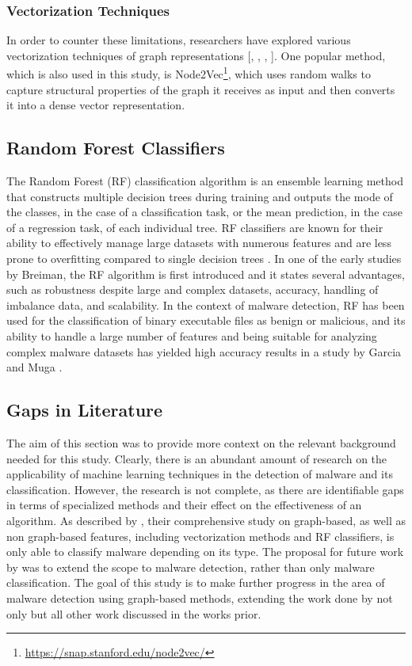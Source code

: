 \documentclass[11pt]{article}
\begin{document}
\subsubsection{Vectorization Techniques}
In order to counter these limitations, researchers have explored various vectorization techniques of graph representations [\cite{hashemi2017graph}, \cite{9023948}, \cite{10.1145/3664649}, \cite{AMJATH2025103651}]. One popular method, which is also used in this study, is Node2Vec\footnote{\href{https://snap.stanford.edu/node2vec/}{https://snap.stanford.edu/node2vec/}}, which uses random walks to capture structural properties of the graph it receives as input and then converts it into a dense vector representation. 

\subsection{Random Forest Classifiers}
The Random Forest (RF) classification algorithm is an ensemble learning method that constructs multiple decision trees during training and outputs the mode of the classes, in the case of a classification task, or the mean prediction, in the case of a regression task, of each individual tree. RF classifiers are known for their ability to effectively manage large datasets with numerous features and are less prone to overfitting compared to single decision trees \cite{breiman2001random}. In one of the early studies by Breiman, the RF algorithm is first introduced and it states several advantages, such as robustness despite large and complex datasets, accuracy, handling of imbalance data, and scalability. 
In the context of malware detection, RF has been used for the classification of binary executable files as benign or malicious, and its ability to handle a large number of features and being suitable for analyzing complex malware datasets has yielded high accuracy results in a study by Garcia and Muga \cite{article}. 

\subsection{Gaps in Literature}
The aim of this section was to provide more context on the relevant background needed for this study. Clearly, there is an abundant amount of research on the applicability of machine learning techniques in the detection of malware and its classification. However, the research is not complete, as there are identifiable gaps in terms of specialized methods and their effect on the effectiveness of an algorithm. As described by \cite{9023948}, their comprehensive study on graph-based, as well as non graph-based features, including vectorization methods and RF classifiers, is only able to classify malware depending on its type. The proposal for future work by \cite{9023948} was to extend the scope to malware detection, rather than only malware classification. The goal of this study is to make further progress in the area of malware detection using graph-based methods, extending the work done by not only \cite{9023948} but all other work discussed in the works prior.
\end{document}
